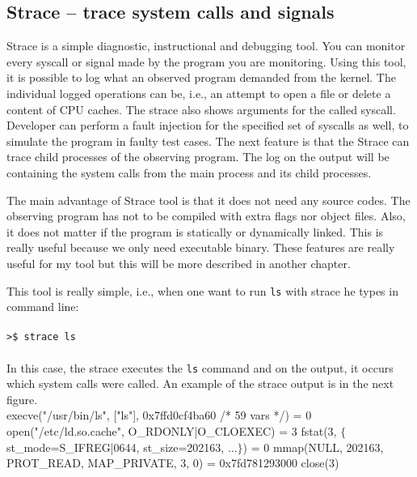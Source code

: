 \subsection{Strace -- trace system calls and signals}

Strace\cite{strace_man} is a simple diagnostic, instructional and debugging tool.
You can monitor every syscall or signal made by the program you are monitoring.
Using this tool, it is possible to log what an observed program demanded from the kernel.
The individual logged operations can be, i.e., an attempt to open a file or delete a content of CPU caches.
The strace also shows arguments for the called syscall.
Developer can perform a fault injection for the specified set of syscalls as well, to simulate the program in faulty test cases.
The next feature is that the Strace can trace child processes of the observing program.
The log on the output will be containing the system calls from the main process and its child processes.

The main advantage of Strace tool is that it does not need any source codes.
The observing program has not to be compiled with extra flags nor object files.
Also, it does not matter if the program is statically or dynamically linked.
% 
% 
This is really useful because we only need executable binary.
These features are really useful for my tool but this will be more described in another chapter.

This tool is really simple, i.e., when one want to run \texttt{ls} with strace he types in command line:\\
\\
\texttt{>\$ strace ls}\\
\\
In this case, the strace executes the \texttt{ls} command and on the output, it occurs which system calls were called.
An example of the strace output is in the next figure.\\[2mm]

\selectfont\noindent
execve("/usr/bin/ls", ["ls"], 0x7ffd0cf4ba60 /* 59 vars */) = 0\linebreak
open("/etc/ld.so.cache", O\_RDONLY|O\_CLOEXEC) = 3\linebreak
fstat(3, $\{$ st\_mode=S\_IFREG|0644, st\_size=202163, ...$\}$) = 0\linebreak
mmap(NULL, 202163, PROT\_READ, MAP\_PRIVATE, 3, 0) = 0x7fd781293000\linebreak
close(3)\linebreak
\fontfamily{\familydefault}\selectfont

